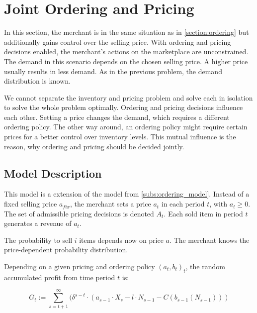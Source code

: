
\section{Joint Ordering and Pricing}
\label{section:joint_ordering_pricing}
In this section, the merchant is in the same situation as in \cref{section:ordering} but additionally gains control over the selling price.
With ordering and pricing decisions enabled, the merchant's actions on the marketplace are unconstrained.
The demand in this scenario depends on the chosen selling price.
A higher price usually results in less demand.
As in the previous problem, the demand distribution is known.

We cannot separate the inventory and pricing problem and solve each in isolation to solve the whole problem optimally.
Ordering and pricing decisions influence each other.
Setting a price changes the demand, which requires a different ordering policy.
The other way around, an ordering policy might require certain prices for a better control over inventory levels.
This mutual influence is the reason, why ordering and pricing should be decided jointly.

\subsection{Model Description}
\label{subs:joint_model}
This model is a extension of the model from \cref{subs:ordering_model}.
Instead of a fixed selling price $a_{fix}$, the merchant sets a price $a_t$ in each period $t$, with $a_t \geq 0$.
The set of admissible pricing decisions is denoted $A_t$.
Each sold item in period $t$ generates a revenue of $a_t$.

The probability to sell $i$ items depends now on price $a$.
The merchant knows the price-dependent probability distribution.

Depending on a given pricing and ordering policy $(a_t, b_t)_t$, the random accumulated profit from time period $t$ is:

$$
G_t := \sum_{s=t+1}^{\infty} (\delta^{s-t} \cdot (a_{s-1} \cdot X_s - l \cdot N_{s-1} - C(b_{s-1}(N_{s-1})))
$$

